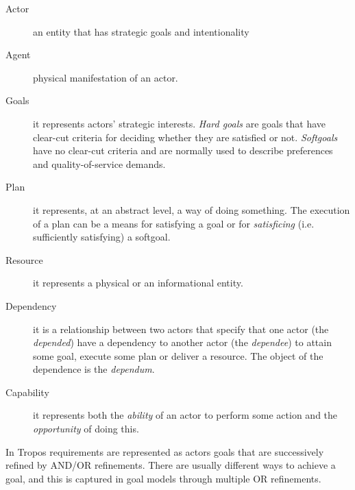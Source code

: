 \begin{description}%
  \item[Actor] an entity that has strategic goals and intentionality

  \item[Agent] physical manifestation of an actor.

  \item[Goals] it represents actors’ strategic interests. \emph{Hard goals} are goals that have clear-cut criteria for deciding whether they are satisfied or not. \emph{Softgoals} have no clear-cut criteria and are normally used to describe preferences and quality-of-service demands.

  \item[Plan] it represents, at an abstract level, a way of doing something. The execution of a plan can be a means for satisfying a goal or for \emph{satisficing} (i.e. sufficiently satisfying) a softgoal.

  \item[Resource]  it represents a physical or an informational entity.

  \item[Dependency] it is a relationship between two actors that specify that one actor (the \emph{depended}) have a dependency to another actor (the \emph{dependee}) to attain some goal, execute some plan or deliver a resource. The object of the dependence is the \emph{dependum}.

  \item[Capability] it represents both the \emph{ability} of an actor to perform some action and the \emph{opportunity} of doing this.



\end{description}


In Tropos requirements are represented as actors goals that are successively refined by AND/OR refinements. There are usually different ways to achieve a goal, and this is captured in goal models through multiple OR refinements.



